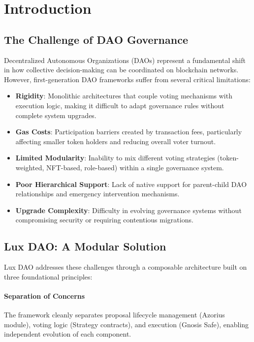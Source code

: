 \section{Introduction}


\subsection{The Challenge of DAO Governance}

Decentralized Autonomous Organizations (DAOs) represent a fundamental shift in how collective decision-making can be coordinated on blockchain networks. However, first-generation DAO frameworks suffer from several critical limitations:

\begin{itemize}
    \item \textbf{Rigidity}: Monolithic architectures that couple voting mechanisms with execution logic, making it difficult to adapt governance rules without complete system upgrades.
    \item \textbf{Gas Costs}: Participation barriers created by transaction fees, particularly affecting smaller token holders and reducing overall voter turnout.
    \item \textbf{Limited Modularity}: Inability to mix different voting strategies (token-weighted, NFT-based, role-based) within a single governance system.
    \item \textbf{Poor Hierarchical Support}: Lack of native support for parent-child DAO relationships and emergency intervention mechanisms.
    \item \textbf{Upgrade Complexity}: Difficulty in evolving governance systems without compromising security or requiring contentious migrations.
\end{itemize}

\subsection{Lux DAO: A Modular Solution}

Lux DAO addresses these challenges through a composable architecture built on three foundational principles:

\paragraph{Separation of Concerns} The framework cleanly separates proposal lifecycle management (Azorius module), voting logic (Strategy contracts), and execution (Gnosis Safe), enabling independent evolution of each component.

